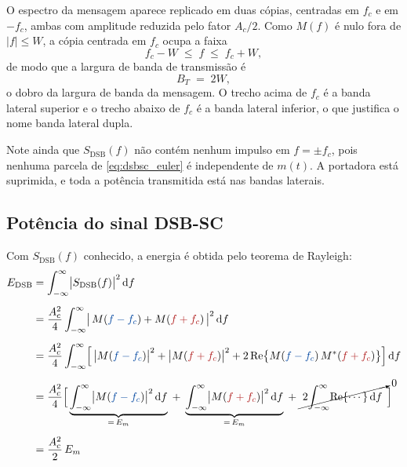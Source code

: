\documentclass[11pt,a4paper]{article}
\newcommand{\DSB}{\text{DSB}}
\newcommand{\dd}{\,\mathrm{d}}
\begin{document}
O espectro da mensagem aparece replicado em duas cópias, centradas em $f_c$ e em $-f_c$, ambas com amplitude reduzida pelo fator $A_c/2$. Como $M(f)$ é nulo fora de $|f| \le W$, a cópia centrada em $f_c$ ocupa a faixa
\begin{equation}
  f_c - W \;\le\; f \;\le\; f_c + W,
  \label{eq:faixa_ocupada}
\end{equation}
de modo que a largura de banda de transmissão é
\begin{equation}
  B_T \;=\; 2W,
  \label{eq:largura_banda}
\end{equation}
o dobro da largura de banda da mensagem. O trecho acima de $f_c$ é a banda lateral superior e o trecho abaixo de $f_c$ é a banda lateral inferior, o que justifica o nome banda lateral dupla.

Note ainda que $S_{\DSB}(f)$ não contém nenhum impulso em $f = \pm f_c$, pois nenhuma parcela de \eqref{eq:dsbsc_euler} é independente de $m(t)$. A portadora está suprimida, e toda a potência transmitida está nas bandas laterais.


\subsection{Potência do sinal DSB-SC}

Com $S_{\DSB}(f)$ conhecido, a energia é obtida pelo teorema de Rayleigh:
\begin{align}
  E_{\DSB}
  &= \int_{-\infty}^{\infty} \bigl|S_{\DSB}(f)\bigr|^{2}\dd f
  \label{eq:pot_passo1}\\[0.5em]
  &= \frac{A_c^{2}}{4}\int_{-\infty}^{\infty}
     \bigl|\, M(\textcolor{azul}{f-f_c}) + M(\textcolor{vermelho}{f+f_c}) \,\bigr|^{2}\dd f
  \label{eq:pot_passo2}\\[0.5em]
  &= \frac{A_c^{2}}{4}\int_{-\infty}^{\infty}
     \Bigl[\,\bigl|M(\textcolor{azul}{f-f_c})\bigr|^{2}
          + \bigl|M(\textcolor{vermelho}{f+f_c})\bigr|^{2}
          + 2\operatorname{Re}\bigl\{ M(\textcolor{azul}{f-f_c})\,M^{*}(\textcolor{vermelho}{f+f_c})\bigr\}\Bigr]\dd f
  \label{eq:pot_passo3}\\[0.5em]
  &= \frac{A_c^{2}}{4}\Bigl[\, \underbrace{\int_{-\infty}^{\infty}\bigl|M(\textcolor{azul}{f-f_c})\bigr|^{2}\dd f}_{=\,E_m}
   \;+\; \underbrace{\int_{-\infty}^{\infty}\bigl|M(\textcolor{vermelho}{f+f_c})\bigr|^{2}\dd f}_{=\,E_m}
   \;+\; \cancelto{0}{\;2\!\int_{-\infty}^{\infty}\!\operatorname{Re}\{\cdots\}\dd f\;} \,\Bigr]
  \label{eq:pot_passo4}\\[0.5em]
  &= \frac{A_c^{2}}{2}\, E_m
  \label{eq:pot_passo5}
\end{align}
\end{document}
